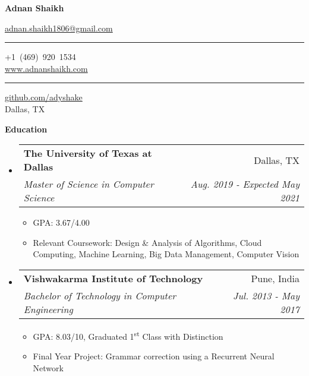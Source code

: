 \documentclass[letterpaper,12pt]{article}
\makeatletter
\newcommand{\ts}{\textsuperscript}
\newcommand{\resitem}[1]{\item #1 \vspace{-2pt}}
\newcommand{\resheading}[1]{{\large \colorbox{mygrey}{\begin{minipage}{0.989\textwidth}{\textbf{#1 \vphantom{p\^{E}}}}\end{minipage}}}}
\newcommand{\ressubheading}[4]{
    \begin{tabular*}{7.0in}{l@{\extracolsep{\fill}}r}
      \textbf{#1} & #2 \\
      \textit{#3} & \textit{#4} \\
    \end{tabular*}\vspace{-6pt}}
\makeatother
\begin{document}
  
  \begin{center}
    \textbf{\Large Adnan Shaikh}\\
    
    \vspace{0.05in}
    
    \href{mailto:adnan.shaikh1806@gmail.com}{adnan.shaikh1806@gmail.com} \rule[-0.4ex]{0.08ex}{1.0em} +1~(469)~920~1534\\
    \href{https://www.adnanshaikh.com}{www.adnanshaikh.com} \rule[-0.4ex]{0.08ex}{1.0em} \href{https://github.com/adyshake}{github.com/adyshake}\\
    Dallas, TX \\
  \end{center}

  \resheading{Education}
  \begin{itemize}
  \item
    \ressubheading{The University of Texas at Dallas}{Dallas, TX}{Master of Science in Computer Science}{Aug. 2019 - Expected May 2021}
    \begin{itemize}
      \resitem {GPA: 3.67/4.00}
      \resitem{Relevant Coursework: Design \& Analysis of Algorithms, Cloud Computing, Machine Learning, Big Data Management, Computer Vision}
    \end{itemize}
  \item
    \ressubheading{Vishwakarma Institute of Technology}{Pune, India}{Bachelor of Technology in Computer Engineering}{Jul. 2013 - May 2017}
    \begin{itemize}
      \resitem {GPA: 8.03/10, Graduated 1\ts{st} Class with Distinction}
      \resitem {Final Year Project: Grammar correction using a Recurrent Neural Network}
    \end{itemize}
  \end{itemize}
\end{document}
